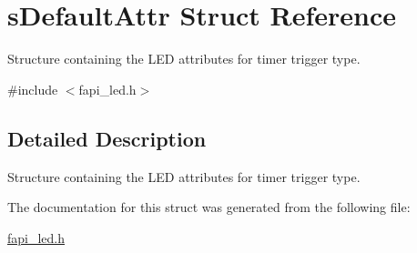 \hypertarget{structsDefaultAttr}{\section{s\-Default\-Attr Struct Reference}
\label{structsDefaultAttr}
}


Structure containing the L\-E\-D attributes for timer trigger type.  




{\ttfamily \#include $<$fapi\-\_\-led.\-h$>$}



\subsection{Detailed Description}
Structure containing the L\-E\-D attributes for timer trigger type. 



The documentation for this struct was generated from the following file\-:\begin{DoxyCompactItemize}
\item 
\hyperlink{fapi__led_8h}{fapi\-\_\-led.\-h}\end{DoxyCompactItemize}
